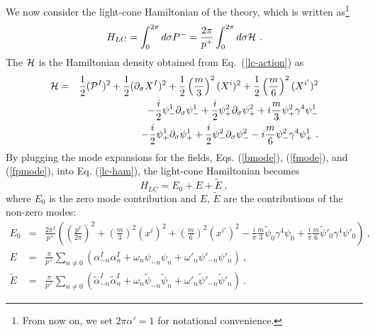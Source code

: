 \documentclass[a4paper,12pt]{article}
\numberwithin{equation}{section}
\begin{document}
We now consider the light-cone Hamiltonian of the theory, which is
written as\footnote{ From now on, we set $2 \pi
  \alpha' = 1$ for notational convenience.}
\begin{equation}
H_{LC}
 = \int^{2\pi}_0 d \sigma P^-
 = \frac{2 \pi}{p^+} \int^{2\pi}_0 d \sigma {\cal H} ~.
\label{lc-ham}
\end{equation}
The ${\cal H}$ is the Hamiltonian density obtained from
Eq.~(\ref{lc-action}) as
\begin{eqnarray}
{\cal H}
 &=&  \frac{1}{2} ({\cal P}^I)^2
    + \frac{1}{2} (\partial_\sigma X^I)^2
    +\frac{1}{2} \left( \frac{m}{3} \right)^2 (X^i)^2
    +\frac{1}{2} \left( \frac{m}{6} \right)^2 (X^{i'})^2
  \nonumber \\
 & & - \frac{i}{2} \psi^1_- \partial_\sigma \psi^1_-
     + \frac{i}{2} \psi^2_+ \partial_\sigma \psi^2_+
     + i \frac{m}{3} \psi^2_+ \gamma^4 \psi^1_-
  \nonumber \\
 & & - \frac{i}{2} \psi^1_+ \partial_\sigma \psi^1_+
     + \frac{i}{2} \psi^2_- \partial_\sigma \psi^2_-
     - i \frac{m}{6} \psi^2_- \gamma^4 \psi^1_+ ~.
\end{eqnarray}
By plugging the mode expansions for the fields, Eqs. (\ref{bmode}),
(\ref{fmode}), and (\ref{fpmode}), into Eq. (\ref{lc-ham}), the
light-cone Hamiltonian becomes
\begin{equation}
H_{LC} = E_0 + E + \tilde{E}~,
\label{lc-h}
\end{equation}
where $E_0$ is the zero mode contribution and $E$, $\tilde{E}$ are the
contributions of the non-zero modes:
\begin{eqnarray}
E_0 &=& \frac{2\pi^2}{p^+}
  \left( \left( \frac{p^I}{2\pi} \right)^2
       + \left( \frac{m}{3} \right)^2 (x^i)^2
       + \left( \frac{m}{6} \right)^2 (x^{i'})^2
       - \frac{i}{\pi} \frac{m}{3} \tilde{\psi}_0 \gamma^4 \psi_0
       + \frac{i}{\pi} \frac{m}{6} \tilde{\psi}'_0 \gamma^4 \psi'_0
  \right)~,
  \nonumber \\
E &=& \frac{\pi}{p^+} \sum_{n \neq 0}
  ( \alpha^I_{-n} \alpha^I_n
   + \omega_n \psi_{-n} \psi_n
   + \omega'_n \psi'_{-n} \psi'_n
  )~,
  \nonumber \\
\tilde{E}
  &=& \frac{\pi}{p^+} \sum_{n \neq 0}
  ( \tilde{\alpha}^I_{-n} \tilde{\alpha}^I_n
   + \omega_n \tilde{\psi}_{-n} \tilde{\psi}_n
   + \omega'_n \tilde{\psi}'_{-n} \tilde{\psi}'_n
  )~.
\end{eqnarray}
\end{document}
